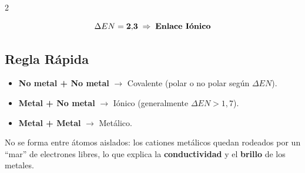 \documentclass[9pt, landscape, letterpaper]{extarticle}
\begin{document}
\begin{multicols}{2}
  \begin{despejesbox}[MgO — $\Delta EN = 3{,}5 - 1{,}2$]
    $$\Delta EN = \mathbf{2{,}3} \;\Rightarrow\; \text{\textbf{Enlace Iónico}}$$
  \end{despejesbox}

  \subsection{Regla Rápida}

  \begin{notabox}
    \begin{itemize}
      \item \textbf{No metal + No metal} $\to$ Covalente
            (polar o no polar según $\Delta EN$).
      \item \textbf{Metal + No metal} $\to$ Iónico
            (generalmente $\Delta EN > 1{,}7$).
      \item \textbf{Metal + Metal} $\to$ Metálico.
    \end{itemize}
  \end{notabox}

  \begin{notabox}
    No se forma entre átomos aislados: los cationes metálicos quedan
    rodeados por un ``mar'' de electrones libres, lo que explica la
    \textbf{conductividad} y el \textbf{brillo} de los metales.
  \end{notabox}

\end{multicols}
\end{document}
